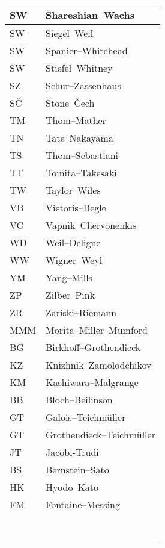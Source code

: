 \documentclass{amsart}
\numberwithin{equation}{section}
\theoremstyle{plain}
\numberwithin{equation}{section}
\theoremstyle{remark}
\begin{document}
\begin{multicols}{2}
{\begin{longtable}{l|l}
SW & Shareshian--Wachs\\ \hline
SW & Siegel--Weil\\ \hline
SW & Spanier--Whitehead\\ \hline
SW & Stiefel--Whitney\\ \hline
SZ & Schur--Zassenhaus\\ \hline
SČ & Stone--Čech\\ \hline
TM & Thom--Mather\\ \hline
TN & Tate--Nakayama\\ \hline
TS & Thom--Sebastiani\\ \hline
TT & Tomita--Takesaki\\ \hline
TW & Taylor--Wiles\\ \hline
VB & Vietoris--Begle\\ \hline
VC & Vapnik--Chervonenkis\\ \hline
WD & Weil--Deligne\\ \hline
WW & Wigner--Weyl\\ \hline
YM & Yang--Mills\\ \hline
ZP & Zilber--Pink\\ \hline
ZR & Zariski--Riemann\\ \hline
MMM & Morita--Miller--Mumford\\ \hline
BG & Birkhoff--Grothendieck\\ \hline
KZ & Knizhnik--Zamolodchikov\\ \hline
KM & Kashiwara--Malgrange\\ \hline
BB & Bloch--Beilinson\\ \hline
GT & Galois--Teichmüller\\ \hline
GT & Grothendieck--Teichmüller\\ \hline
JT & Jacobi-Trudi\\ \hline
BS & Bernstein--Sato\\ \hline
HK & Hyodo--Kato\\ \hline
FM &  Fontaine--Messing\\ \hline
 & \\ \hline
 & \\ \hline
 & \\ \hline
 & \\ \hline
 & \\ \hline
 & \\ \hline
 & \\ \hline
 & \\ \hline
\end{longtable}
\unskip
\unpenalty
\unpenalty}

\unvbox\ltmcbox




\end{multicols}
\end{document}
